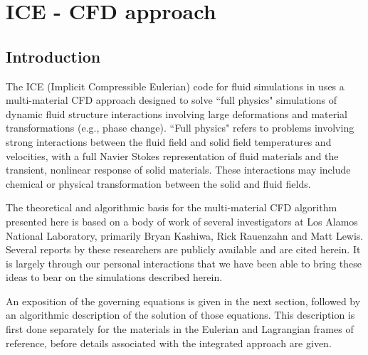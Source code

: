 \chapter{ICE - CFD approach} \label{ch:ICETheory}

\section{Introduction}
The ICE (Implicit Compressible Eulerian) code for fluid simulations
in \Vaango uses a multi-material CFD approach designed to solve 
``full physics" simulations of dynamic fluid structure interactions 
involving large deformations and material
transformations (e.g., phase change).  ``Full physics" refers to
problems involving strong interactions between the fluid field and
solid field temperatures and velocities, with a full Navier Stokes
representation of fluid materials and the transient, nonlinear
response of solid materials.  These interactions may include chemical
or physical transformation between the solid and fluid fields.

The theoretical and algorithmic basis for the multi-material CFD
algorithm presented here is based on a body of work of several
investigators at Los Alamos National Laboratory, primarily Bryan
Kashiwa, Rick Rauenzahn and Matt Lewis.  Several reports by these
researchers are publicly available and are cited herein.  It is
largely through our personal interactions that we have been able to
bring these ideas to bear on the simulations described herein.

An exposition of the governing equations is given in the next section,
followed by an algorithmic description of the solution of those equations.
This description is first done separately for the materials in the Eulerian
and Lagrangian frames of reference, before details associated with the
integrated approach are given. 

